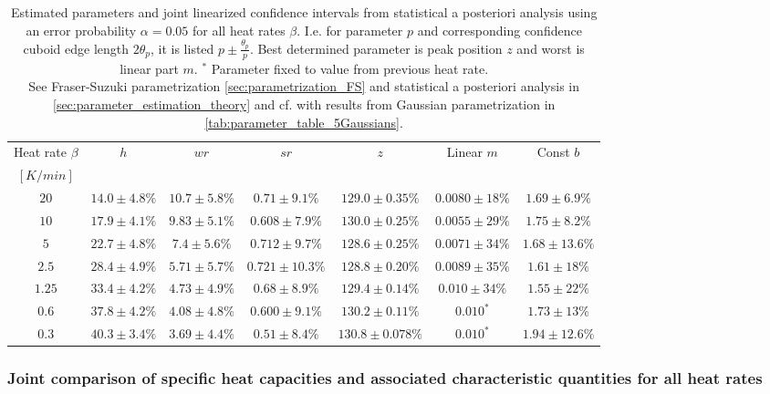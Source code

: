 \documentclass{scrartcl}[12pt, halfparskip]
\numberwithin{equation}{section}
\numberwithin{figure}{section}
\numberwithin{table}{section}
\begin{document}
\begin{table}[H]
	\caption{Estimated parameters and joint linearized confidence intervals from statistical a posteriori analysis using an error probability $\alpha=0.05$ for all heat rates $\beta$. 
	I.e. for parameter $p$ and corresponding confidence cuboid edge length $2\theta_p$, it is listed $p \pm \frac{\theta_p}{p}$.
	Best determined parameter is  peak position $z$ and worst is linear part $m$.  $^*$ Parameter fixed to value from previous heat rate. \\
	See Fraser-Suzuki parametrization \cref{sec:parametrization_FS} and statistical a posteriori analysis in \cref{sec:parameter_estimation_theory} and cf. with results from Gaussian parametrization in \cref{tab:parameter_table_5Gaussians}.}
	\hspace{-1.6cm}
	\begin{tabular}{| c | c | c | c | c | c | c |} \hline
		Heat rate $\beta$ & $h$ & $wr$ & $sr$ & $z$ & Linear $m$ & Const $b$ \\ 
		$[K/min]$ & & & & & & \\ \hline
		$20$ & $14.0 \pm 4.8\%$ & $10.7 \pm 5.8\%$ & $0.71 \pm 9.1\%$ & $129.0 \pm 0.35\%$ & $0.0080 \pm 18\%$ & $1.69 \pm 6.9\%$ \\
		$10$ & $17.9 \pm 4.1\%$ & $9.83 \pm 5.1\%$ & $0.608 \pm 7.9\%$ & $130.0 \pm 0.25\%$ & $0.0055 \pm 29\%$ & $1.75 \pm 8.2\%$  \\
		$5$ & $22.7 \pm 4.8\%$ & $7.4 \pm 5.6\%$ & $0.712 \pm 9.7\%$ & $128.6 \pm 0.25\%$ & $0.0071 \pm 34\%$ & $1.68 \pm 13.6\%$ \\
		$2.5$ & $28.4 \pm 4.9\%$ & $5.71 \pm 5.7\%$ & $0.721 \pm 10.3\%$ & $128.8 \pm 0.20\%$ & $0.0089 \pm 35\%$ & $1.61 \pm 18\%$ \\
		$1.25$ & $33.4 \pm 4.2\%$ & $4.73 \pm 4.9\%$ & $0.68 \pm 8.9\%$ & $129.4 \pm 0.14\%$ & $0.010 \pm 34\%$ & $1.55 \pm 22\%$ \\
		$0.6$ & $37.8 \pm 4.2\%$ & $4.08 \pm 4.8\%$ & $0.600 \pm 9.1\%$ & $130.2 \pm 0.11\%$ & $0.010^*$ & $1.73 \pm 13\%$ \\
		$0.3$ & $40.3 \pm 3.4\%$ & $3.69 \pm 4.4\%$ & $0.51 \pm 8.4\%$ & $130.8 \pm 0.078\%$ & $0.010^*$ & $1.94 \pm 12.6\%$ \\ \hline
	\end{tabular}
	\label{tab:parameter_table_FS}
\end{table}

\subsubsection{Joint comparison of specific heat capacities and associated characteristic quantities for all heat rates}
\end{document}
